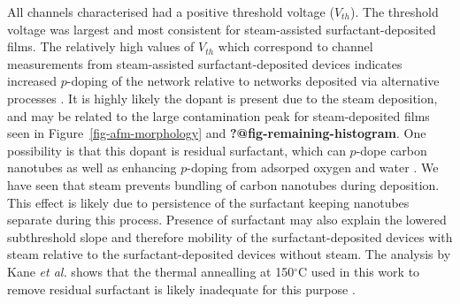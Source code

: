 \documentclass[
  a4paper,
]{scrbook}
\begin{document}
All channels characterised had a positive threshold voltage
(\(V_{th}\)). The threshold voltage was largest and most consistent for
steam-assisted surfactant-deposited films. The relatively high values of
\(V_{th}\) which correspond to channel measurements from steam-assisted
surfactant-deposited devices indicates increased \(p\)-doping of the
network relative to networks deposited via alternative processes
\autocite{Kang2005,Heller2008,Murugathas2018}. It is highly likely the
dopant is present due to the steam deposition, and may be related to the
large contamination peak for steam-deposited films seen in
Figure~\ref{fig-afm-morphology} and \textbf{?@fig-remaining-histogram}.
One possibility is that this dopant is residual surfactant, which can
\(p\)-dope carbon nanotubes as well as enhancing \(p\)-doping from
adsorped oxygen and water \autocite{Kane2014,Nonoguchi2018}. We have
seen that steam prevents bundling of carbon nanotubes during deposition.
This effect is likely due to persistence of the surfactant keeping
nanotubes separate during this process. Presence of surfactant may also
explain the lowered subthreshold slope and therefore mobility of the
surfactant-deposited devices with steam relative to the
surfactant-deposited devices without steam. The analysis by Kane
\emph{et al.} shows that the thermal annealling at 150\(^\circ\)C used
in this work to remove residual surfactant is likely inadequate for this
purpose \autocite{Kane2014}.
\end{document}
